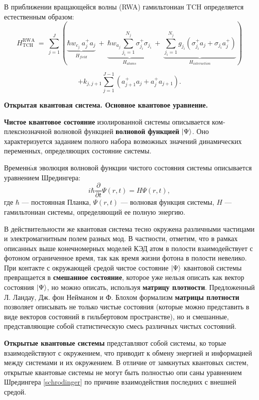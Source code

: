 В приближении вращающейся волны (RWA) \cite{rwa_rabi_1,rwa_rabi_2,ozhigov_qq} гамильтониан TCH определяется естественным образом:
\[
H_{\text{TCH}}^{\text{RWA}}~=~\sum_{j=1}^J \left(\underbrace{\hbar w_{c_j}\ a_j^+a_j}_{\textstyle H_{field}}~+~\underbrace{\hbar w_{a_j}\sum_{j_{i}=1}^{N_{j}}{\sigma_{j_i}^+\sigma_{j_i}}}_{\textstyle H_{atoms}}~+~\underbrace{\sum_{j_{i}=1}^{N_{j}}g_{j_i}{(\sigma_{j_i}^+a_j+\sigma_{j_i}a_j^+)}}_{\textstyle H_{interaction}} \right)
\]

\begin{equation}
	+k_{j,j+1}\sum_{j=1}^{J-1}{\left(a_{j+1}^+a_j+a_{j}^+a_{j+1}\right)}.
\end{equation}

\clearpage
\indent\textbf{Открытая квантовая система. Основное квантовое уравнение.}

\textbf{Чистое квантовое состояние} изолированной системы описывается ком­плекснозначной волновой функцией \textbf{волновой функцией} $|\Psi\rangle$. Оно характеризуется заданием полного набора возможных значений динамических переменных, определяющих состояние системы.

Временн$\acute{\text{a}}$я эволюция волновой функции чистого состояния системы описывается уравнением Шредингера:
\begin{equation}\label{schrodinger}
	i\hbar\frac{\partial}{\partial t}\Psi(r,t) = H\Psi(r,t),
\end{equation}
где $\hbar$ --- постоянная Планка, $\Psi(r,t)$ --- волновая функция системы, $H$ --- гамильтониан системы, определяющий ее полную энергию.

В действительности же квантовая система тесно окружена различными частицами и электромагнитным полем разных мод. В частности, отметим, что в рамках описанных выше конечномерных моделей КЭД атом в полости взаимодействует с фотоном ограниченное время, так как время жизни фотона в полости невелико. При контакте с окружающей средой чистое состояние $|\Psi\rangle$ квантовой системы превращается в \textbf{смешанное состояние}, которое уже нельзя описать как вектор состояния $ |\Psi\rangle$, но можно описать, используя \textbf{матрицу плотности}. Предложенный Л. Ландау, Дж. фон Нейманом и Ф. Блохом формализм \textbf{матрицы плотности} \cite{landau,belousov,messia} позволяет описывать не только чистые состояния (которые можно представить в виде векторов состояний в гильбертовом пространстве), но и смешанные, представляющие собой статистическую смесь различных чистых состояний.

\textbf{Открытые квантовые системы} \cite{breuer} представляют собой системы, ко­ торые взаимодействуют с окружением, что приводит к обмену энергией и информацией между системами и их окружением. В отличие от замкнутых квантовых систем, открытые квантовые системы не могут быть полностью опи­ саны уравнением Шредингера \eqref{schrodinger} по причине взаимодействия последних с внешней средой.

